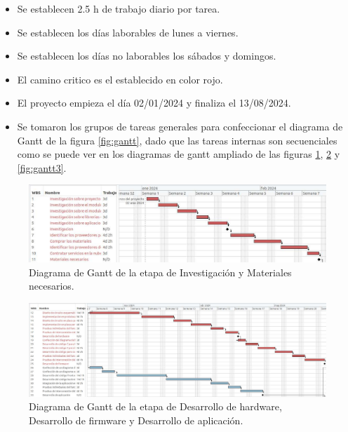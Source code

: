 \documentclass[
11pt, %
]{charter}
\begin{document}
\begin{itemize}
\item Se establecen  2.5 h de trabajo diario por tarea.
\item Se establecen  los días laborables de lunes a viernes.
\item Se establecen  los días no laborables los sábados y domingos.
\item El camino critico es el establecido en color rojo.
\item El proyecto empieza el día 02/01/2024 y finaliza el 13/08/2024.
\item Se tomaron los grupos de tareas generales para confeccionar el diagrama de Gantt de la figura \ref{fig:gantt}, dado que las tareas internas son secuenciales como se puede ver en los diagramas de gantt ampliado de las figuras \ref{fig:gantt1}, \ref{fig:gantt2} y \ref{fig:gantt3}.
\end{itemize}



\begin{figure}[htpb]
\centering 
\includegraphics[width=1.0\textwidth, height=.43 \textwidth]{./Figuras/ganttProyecto1.pdf}
\caption{Diagrama de Gantt de la etapa de Investigación y Materiales necesarios.}
\label{fig:gantt1}
\end{figure}


\begin{figure}[htpb]
\centering 
\includegraphics[width=1.0\textwidth, height=.43 \textwidth]{./Figuras/ganttProyecto2.pdf}
\caption{Diagrama de Gantt de la etapa de Desarrollo de hardware, Desarrollo de firmware y Desarrollo de aplicación.}
\label{fig:gantt2}
\end{figure}
\end{document}
